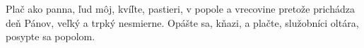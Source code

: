 Plač ako panna, ľud môj, kvíľte, pastieri, v popole a vrecovine
\versseparator
pretože prichádza deň Pánov, veľký a trpký nesmierne.
\versseparator
Opášte sa, kňazi, a plačte, služobníci oltára, posypte sa popolom.